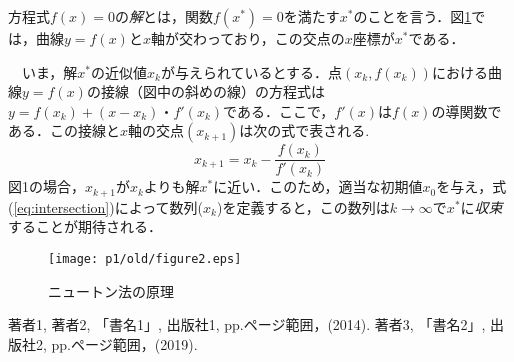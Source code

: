 \documentclass[11pt]{jarticle}
\begin{document}
方程式$f(x)=0$の{\em 解}とは，関数$f(x^*)=0$を満たす$x^*$のことを言う．図\ref{figure}では，曲線$y=f(x)$と$x$軸が交わっており，この交点の$x$座標が$x^*$である．

　いま，解$x^*$の近似値$x_k$が与えられているとする．点$(x_k,f(x_k))$における曲線$y=f(x)$の接線（図中の斜めの線）の方程式は$y=f(x_k)+(x-x_k)・f'(x_k)$である．ここで，$f'(x)$は$f(x)$の導関数である．この接線と$x$軸の交点$(x_{k+1})$は次の式で表される\cite{text2017}.
\begin{equation}
x_{k+1}=x_k-\frac{f(x_k)}{f'(x_k)}
\label{eq:intersection}
\end{equation}
図1の場合，$x_{k+1}$が$x_k$よりも解$x^*$に近い．このため，適当な初期値$x_0$を与え，式(\ref{eq:intersection})によって数列($x_k$)を定義すると，この数列は$k \rightarrow \infty $で$x^*$に{\em 収束}することが期待される．
\begin{figure}[h]
\texttt{[image: p1/old/figure2.eps]}
\caption{ニュートン法の原理}
\label{figure}
\end{figure}
\begin{thebibliography}{99}
 著者1, 著者2, 「書名1」, 出版社1, pp.ページ範囲，(2014).
 著者3, 「書名2」, 出版社2, pp.ページ範囲，(2019).
\end{thebibliography}
\end{document}
